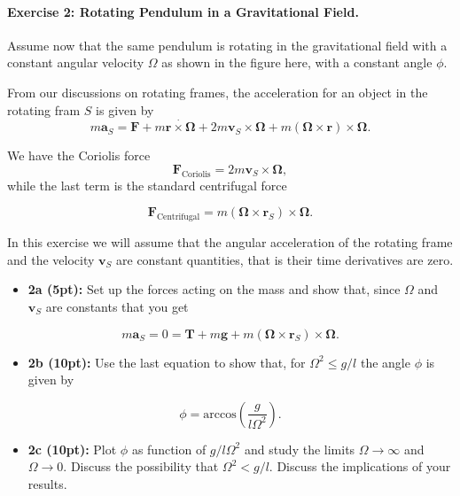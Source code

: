 \documentclass[%
oneside,                 %
final,                   %
10pt]{article}
\begin{document}
\noindent
\paragraph{Exercise 2: Rotating Pendulum in a Gravitational Field.}
Assume now that the same pendulum is rotating in the gravitational field with a constant angular velocity $\Omega$ as shown in the figure here, with a constant angle $\phi$.

From our discussions on rotating frames, the acceleration for an object in the rotating fram $S$  is given by
\[
m\bm{a}_{S}=\bm{F}+m\dot{\bm{r}\times\bm{\Omega}}+2m\bm{v}_S\times\bm{\Omega}+m(\bm{\Omega}\times\bm{r})\times\bm{\Omega}.
\]

We have the Coriolis force
\[
\bm{F}_{\mathrm{Coriolis}}=2m\bm{v}_S\times\bm{\Omega},
\]
while the last term is the standard centrifugal force

\[
\bm{F}_{\mathrm{Centrifugal}}=m\left(\bm{\Omega}\times\bm{r}_S\right)\times\bm{\Omega}.
\]

In this exercise  we will assume that the angular acceleration of the rotating frame and the velocity $\bm{v}_S$ are  constant quantities, that is their time derivatives are zero.

\begin{itemize}
\item \textbf{2a (5pt):} Set up the forces acting on the mass and show that, since $\Omega$ and $\bm{v}_S$ are constants that you get 
\end{itemize}

\noindent
\[
m\bm{a}_{S}=0=\bm{T}+m\bm{g}+m(\bm{\Omega}\times\bm{r}_S)\times\bm{\Omega}.
\]

\begin{itemize}
\item \textbf{2b (10pt):} Use the last equation to show that, for $\Omega^2 \le g/l$  the angle $\phi$ is given by
\end{itemize}

\noindent
\[
\phi=\mathrm{arccos}\left(\frac{g}{l\Omega^2}\right).
\]

\begin{itemize}
\item \textbf{2c (10pt):} Plot $\phi$ as function of $g/l\Omega^2$ and study the limits $\Omega\rightarrow \infty$ and $\Omega\rightarrow 0$. Discuss  the possibility that $\Omega^2 < g/l$. Discuss the implications of your results. 
\end{itemize}

\noindent


\end{document}
